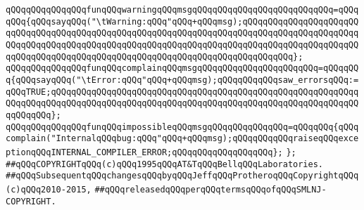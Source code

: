 \verb|qQQqqQQqqQQqqQQqfunqQQqwarningqQQqmsgqQQqqQQqqQQqqQQqqQQqqQQqqQQq=qQQqqQQq{qQQqsayqQQq("\tWarning:qQQq"qQQq+qQQqmsg);qQQqqQQqqQQqqQQqqQQqqQQqqQQqqQQqqQQqqQQqqQQqqQQqqQQqqQQqqQQqqQQqqQQqqQQqqQQqqQQqqQQqqQQqqQQqqQQqqQQqqQQqqQQqqQQqqQQqqQQqqQQqqQQqqQQqqQQqqQQqqQQqqQQqqQQqqQQqqQQqqQQqqQQqqQQqqQQqqQQqqQQqqQQqqQQqqQQqqQQqqQQqqQQqqQQqqQQqqQQq};|\newline
\verb|qQQqqQQqqQQqqQQqfunqQQqcomplainqQQqmsgqQQqqQQqqQQqqQQqqQQqqQQq=qQQqqQQq{qQQqsayqQQq("\tError:qQQq"qQQq+qQQqmsg);qQQqqQQqqQQqsaw_errorsqQQq:=qQQqTRUE;qQQqqQQqqQQqqQQqqQQqqQQqqQQqqQQqqQQqqQQqqQQqqQQqqQQqqQQqqQQqqQQqqQQqqQQqqQQqqQQqqQQqqQQqqQQqqQQqqQQqqQQqqQQqqQQqqQQqqQQqqQQqqQQqqQQqqQQqqQQq};|\newline
\verb|qQQqqQQqqQQqqQQqfunqQQqimpossibleqQQqmsgqQQqqQQqqQQqqQQq=qQQqqQQq{qQQqcomplain("InternalqQQqbug:qQQq"qQQq+qQQqmsg);qQQqqQQqqQQqraiseqQQqexceptionqQQqINTERNAL_COMPILER_ERROR;qQQqqQQqqQQqqQQqqQQq};|\newline
\verb|};|\newline
\newline
\newline
\verb|##qQQqCOPYRIGHTqQQq(c)qQQq1995qQQqAT&TqQQqBellqQQqLaboratories.|\newline
\verb|##qQQqSubsequentqQQqchangesqQQqbyqQQqJeffqQQqProtheroqQQqCopyrightqQQq(c)qQQq2010-2015,|\newline
\verb|##qQQqreleasedqQQqperqQQqtermsqQQqofqQQqSMLNJ-COPYRIGHT.|\newline

